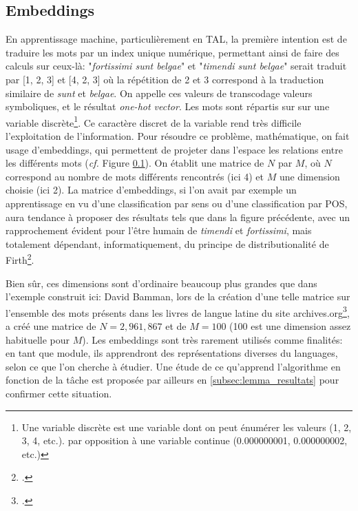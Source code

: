 \subsection{Embeddings}
\label{deep-learning:embeddings}

En apprentissage machine, particulièrement en TAL, la première intention est de traduire les mots par un index unique numérique, permettant ainsi de faire des calculs sur ceux-là: "\textit{fortissimi sunt belgae}" et "\textit{timendi sunt belgae}" serait traduit par [1, 2, 3] et  [4, 2, 3] où la répétition de 2 et 3 correspond à la traduction similaire de \textit{sunt} et \textit{belgae}. On appelle ces valeurs de transcodage valeurs symboliques, et le résultat \textit{one-hot vector}. Les mots sont répartis sur sur une variable discrète\footnote{Une variable discrète est une variable dont on peut énumérer les valeurs (1, 2, 3, 4, etc.). par opposition à une variable continue (0.000000001, 0.000000002, etc.)}. Ce caractère discret de la variable rend très difficile l'exploitation de l'information. Pour résoudre ce problème, mathématique, on fait usage d'embeddings, qui permettent de projeter dans l'espace les relations entre les différents mots (\textit{cf.} Figure \ref{deep-learning:embeddings}). On établit une matrice de $N$ par $M$, où $N$ correspond au nombre de mots différents rencontrés (ici 4) et $M$ une dimension choisie (ici 2). La matrice d'embeddings, si l'on avait par exemple un apprentissage en vu d'une classification par sens ou d'une classification par POS, aura tendance à proposer des résultats tels que dans la figure précédente, avec un rapprochement évident pour l'être humain de \textit{timendi} et \textit{fortissimi}, mais totalement dépendant, informatiquement, du principe de distributionalité de Firth\footcite{firth_papers_1957}.





Bien sûr, ces dimensions sont d'ordinaire beaucoup plus grandes que dans l'exemple construit ici: David Bamman, lors de la création d'une telle matrice sur l'ensemble des mots présents dans les livres de langue latine du site archives.org\footcite{bamman_11k_2012}, a créé une matrice de $N=2,961,867$ et de $M=100$ (100 est une dimension assez habituelle pour $M$). Les embeddings sont très rarement utilisés comme finalités: en tant que module, ils apprendront des représentations diverses du languages, selon ce que l'on cherche à étudier. Une étude de ce qu'apprend l'algorithme en fonction de la tâche est proposée par ailleurs en \ref{subsec:lemma_resultats} pour confirmer cette situation. %

